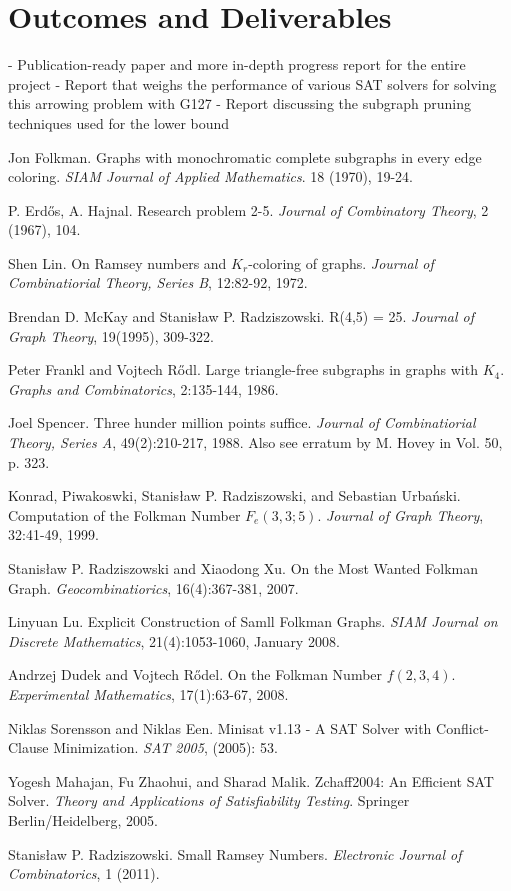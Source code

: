 \documentclass[paper=a4, fontsize=11pt]{scrartcl} %
\begin{document}
\section{Outcomes and Deliverables}
- Publication-ready paper and more in-depth progress report for the entire project
- Report that weighs the performance of various SAT solvers for solving this arrowing problem with G127
- Report discussing the subgraph pruning techniques used for the lower bound


\begin{thebibliography}{9}

 Jon Folkman. Graphs with monochromatic complete subgraphs in
every edge coloring. \emph{SIAM Journal of Applied Mathematics}. 18 (1970), 19-24.

 P. Erd\H os, A. Hajnal. Research problem 2-5. \emph{Journal of Combinatory Theory}, 
2 (1967), 104.

 Shen Lin. On Ramsey numbers and $K_r$-coloring of graphs. \emph{Journal of
Combinatiorial Theory, Series B}, 12:82-92, 1972.

 Brendan D. McKay and Stanis{\l}aw P. Radziszowski. R(4,5) = 25. \emph{Journal
of Graph Theory}, 19(1995), 309-322.

 Peter Frankl and Vojtech R\H odl. Large triangle-free subgraphs
in graphs with $K_4$. \emph{Graphs and Combinatorics}, 2:135-144, 1986.

 Joel Spencer. Three hunder million points suffice. \emph{Journal of
Combinatiorial Theory, Series A}, 49(2):210-217, 1988. Also see erratum by M. Hovey in
Vol. 50, p. 323.

 Konrad, Piwakoswki, Stanis{\l}aw P. Radziszowski, and Sebastian
Urba\'nski. Computation of the Folkman Number $F_e(3,3;5)$. \emph{Journal of Graph
Theory}, 32:41-49, 1999.

 Stanis{\l}aw P. Radziszowski and Xiaodong Xu. On the Most Wanted
Folkman Graph. \emph{Geocombinatiorics}, 16(4):367-381, 2007.

 Linyuan Lu. Explicit Construction of Samll Folkman Graphs. \emph{SIAM Journal
on Discrete Mathematics}, 21(4):1053-1060, January 2008.

 Andrzej Dudek and Vojtech R\H odel. On the Folkman Number $f(2,3,4)$.
\emph{Experimental Mathematics}, 17(1):63-67, 2008.

 Niklas Sorensson and Niklas Een. Minisat v1.13 - A SAT Solver with Conflict-Clause Minimization. \emph{SAT 2005}, (2005): 53.

 Yogesh Mahajan, Fu Zhaohui, and Sharad Malik. Zchaff2004: An Efficient SAT Solver. \emph{Theory and Applications of Satisfiability Testing}. Springer Berlin/Heidelberg, 2005.

 Stanis{\l}aw P. Radziszowski. Small Ramsey Numbers. \emph{Electronic Journal of Combinatorics}, 1 (2011).

\end{thebibliography}
\end{document}
